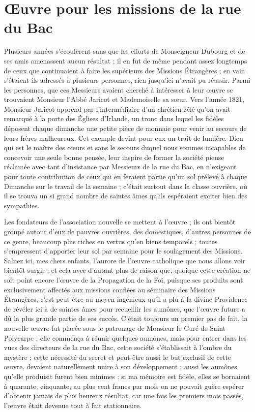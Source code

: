 \documentclass[11pt,a4paper]{report}
\begin{document}
\section*{Œuvre pour les missions de la rue du Bac}

Plusieurs années s'écoulèrent sans que les efforts de Monseigneur Dubourg et de ses amis amenassent aucun résultat ; il en fut de même pendant assez longtemps de ceux que continuaient à faire les supérieurs des Missions Étrangères ; en vain s'étaient-ils adressés à plusieurs personnes, rien jusqu'ici n'avait pu réussir. Parmi les personnes, que ces Messieurs avaient cherché à intéresser à leur œuvre se trouvaient Monsieur l'Abbé Jaricot et Mademoiselle sa sœur. Vers l'année 1821, Monsieur Jaricot apprend par l'intermédiaire d'un chrétien zélé qu'on avait remarqué à la porte des Églises d'Irlande, un tronc dans lequel les fidèles déposent chaque dimanche une petite pièce de monnaie pour venir au secours de leurs frères malheureux. Cet exemple devint pour eux un trait de lumière. Dieu qui est le maître des cœurs et sans le secours duquel nous sommes incapables de concevoir une seule bonne pensée, leur inspire de former la société pieuse réclamée avec tant d'insistance par Messieurs de la rue du Bac, en n'exigeant pour toute contribution de ceux qui en feraient partie qu'un sol prélevé à chaque Dimanche sur le travail de la semaine ; c'était surtout dans la classe ouvrière, où il se trouva un si grand nombre de saintes âmes qu'ils espéraient exciter bien des sympathies.

Les fondateurs de l'association nouvelle se mettent à l'œuvre ; ils ont bientôt groupé autour d'eux de pauvres ouvrières, des domestiques, d'autres personnes de ce genre, beaucoup plus riches en vertus qu'en biens temporels ; toutes s'empressent d'apporter leur sol par semaine pour le soulagement des Missions. Saluez ici, mes chers enfants, l'aurore de l'œuvre catholique que nous allons voir bientôt surgir ; et cela avec d'autant plus de raison que, quoique cette création ne soit point encore l'œuvre de la Propagation de la Foi, puisque ses produits sont exclusivement affectés aux missions confiées au séminaire des Missions Étrangères, c'est peut-être au moyen ingénieux qu'il a plu à la divine Providence de révéler ici à de saintes âmes pour recueillir les aumônes, que l'œuvre future a dû la plus grande partie de ses succès. C'était toujours un premier pas de fait, la nouvelle œuvre fut placée sous le patronage de Monsieur le Curé de Saint Polycarpe ; elle commença à réunir quelques aumônes, mais pour entrer dans les vues des directeurs de la rue du Bac, cette société s'établissait à l'ombre du mystère ; cette nécessité du secret et peut-être aussi le but exclusif de cette œuvre, devaient naturellement nuire à son développement ; aussi les aumônes qu'elle produisit furent bien minimes ; si ma mémoire est fidèle, elles se bornaient à quarante, cinquante, au plus cent francs par mois on ne pouvait guère espérer d'obtenir jamais de plus heureux résultat, car une fois les premiers mois passés, l'œuvre était devenue tout à fait stationnaire.
\end{document}
